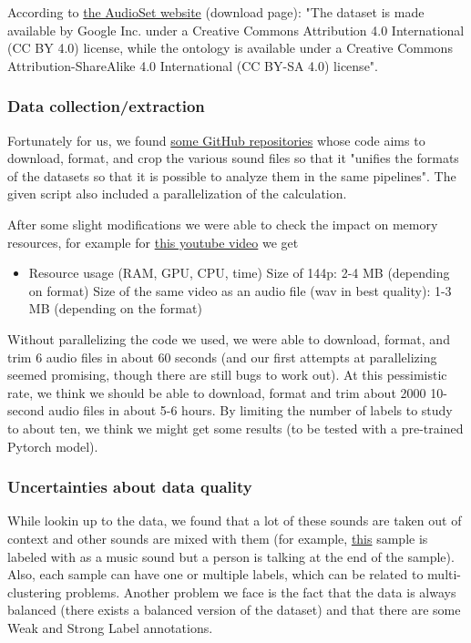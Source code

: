 \documentclass[11pt]{article}
\begin{document}
According to \hyperref[item:google-audioset]{the AudioSet website} (download page): "The dataset is made available by Google Inc. under a Creative Commons Attribution 4.0 International (CC BY 4.0) license, while the ontology is available under a Creative Commons Attribution-ShareAlike 4.0 International (CC BY-SA 4.0) license".


\subsubsection{Data collection/extraction}

Fortunately for us, we found \hyperref[item:google-audioset-reformatted]{some GitHub repositories} whose code aims to download, format, and crop the various sound files so that it "unifies the formats of the datasets so that it is possible to analyze them in the same pipelines". The given script also included a parallelization of the calculation.

After some slight modifications we were able to check the impact on memory resources, for example for \href{https://www.youtube.com/watch?v=dQw4w9WgXcQ}{this youtube video} we get

\begin{itemize}
  \item Resource usage (RAM, GPU, CPU, time)
        \subitem Size of 144p: 2-4 MB (depending on format)
        \subitem Size of the same video as an audio file (wav in best quality): 1-3 MB (depending on the format)
\end{itemize}

Without parallelizing the code we used, we were able to download, format, and trim 6 audio files in about 60 seconds (and our first attempts at parallelizing seemed promising, though there are still bugs to work out). At this pessimistic rate, we think we should be able to download, format and trim about 2000 10-second audio files in about 5-6 hours. By limiting the number of labels to study to about ten, we think we might get some results (to be tested with a pre-trained Pytorch model).

\subsubsection{Uncertainties about data quality}

While lookin up to the data, we found that a lot of these sounds are taken out of context and other sounds are mixed with them (for example, \hyperref{https://www.youtube.com/watch?v=-0CamVQdP_Y}{}{}{this} sample is labeled with as a music sound but a person is talking at the end of the sample). Also, each sample can have one or multiple labels, which can be related to multi-clustering problems.
Another problem we face is the fact that the data is always balanced (there exists a balanced version of the dataset) and that there are some Weak and Strong Label annotations.
\end{document}
